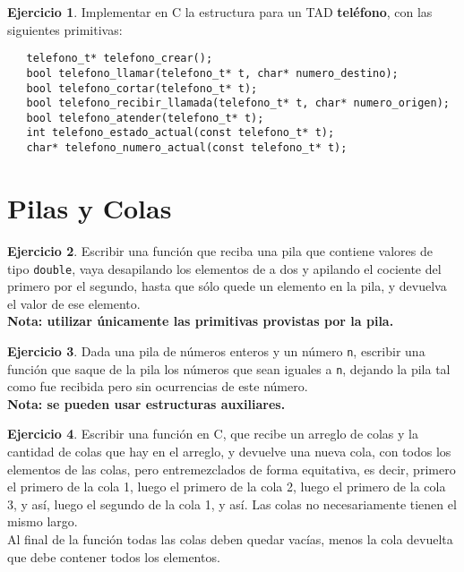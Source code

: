 \documentclass[11pt,a4paper]{article}
\theoremstyle{definition}
\newtheorem{ejercicio}{Ejercicio}[section]
\begin{document}
\begin{ejercicio}
Implementar en C la estructura para un TAD \textbf{teléfono}, con
las siguientes primitivas:
\begin{lstlisting}
   telefono_t* telefono_crear();
   bool telefono_llamar(telefono_t* t, char* numero_destino);
   bool telefono_cortar(telefono_t* t);
   bool telefono_recibir_llamada(telefono_t* t, char* numero_origen);
   bool telefono_atender(telefono_t* t);
   int telefono_estado_actual(const telefono_t* t);
   char* telefono_numero_actual(const telefono_t* t);
\end{lstlisting}
\end{ejercicio}


\newpage
\section{Pilas y Colas}

\begin{ejercicio}
Escribir una función que reciba una pila que contiene valores de tipo
\texttt{double}, vaya desapilando los elementos de a dos y apilando el cociente
del primero por el segundo, hasta que sólo quede un elemento en la pila, y
devuelva el valor de ese elemento. \\
\bf{Nota}: utilizar únicamente las primitivas provistas por la pila.
\end{ejercicio}

\begin{ejercicio}
Dada una pila de números enteros y un número \verb!n!, escribir una función que
saque de la pila los números que sean iguales a \verb!n!, dejando la pila tal como
fue recibida pero sin ocurrencias de este número. \\
\bf{Nota}: se pueden usar estructuras auxiliares.
\end{ejercicio}

\begin{ejercicio}
Escribir una función en C, que recibe un arreglo de colas y la cantidad de
colas que hay en el arreglo, y devuelve una nueva cola, con todos los
elementos de las colas, pero entremezclados de forma equitativa, es decir,
primero el primero de la cola 1, luego el primero de la cola 2, luego el
primero de la cola 3, y así, luego el segundo de la cola 1, y así.  Las
colas no necesariamente tienen el mismo largo. \\
Al final de la función todas las colas deben quedar vacías, menos la cola
devuelta que debe contener todos los elementos.
\end{ejercicio}
\end{document}
